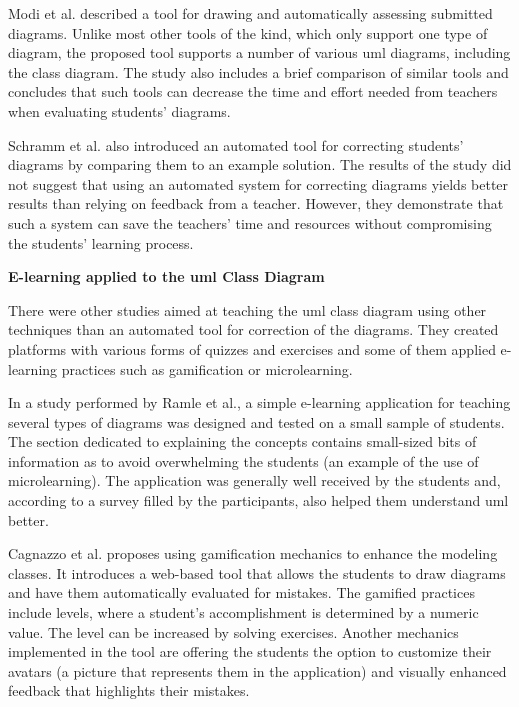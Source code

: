 Modi et al.\cite{uml_eval_auto} described a tool for drawing and automatically assessing submitted diagrams. Unlike most other tools of the kind, which only support one type of diagram, the proposed tool supports a number of various \ac{uml} diagrams, including the class diagram. The study also includes a brief comparison of similar tools and concludes that such tools can decrease the time and effort needed from teachers when evaluating students' diagrams.

Schramm et al.\cite{schramm2012teaching} also introduced an automated tool for correcting students’ diagrams by comparing them to an example solution. The results of the study did not suggest that using an automated system for correcting diagrams yields better results than relying on feedback from a teacher. However, they demonstrate that such a system can save the teachers’ time and resources without compromising the students’ learning process.


\textbf{E-learning applied to the \ac{uml} Class Diagram}

There were other studies aimed at teaching the \acl{uml} class diagram using other techniques than an automated tool for correction of the diagrams. They created platforms with various forms of quizzes and exercises and some of them applied e-learning practices such as gamification or microlearning.

In a study performed by Ramle et al.\cite{ramle2021uml}, a simple e-learning application for teaching several types of diagrams was designed and tested on a small sample of students. The section dedicated to explaining the concepts contains small-sized bits of information as to avoid overwhelming the students (an example of the use of microlearning). The application was generally well received by the students and, according to a survey filled by the participants, also helped them understand \ac{uml} better.

Cagnazzo et al.\cite{cagnazzo2023umlegend} proposes using gamification mechanics to enhance the modeling classes. It introduces a web-based tool that allows the students to draw diagrams and have them automatically evaluated for mistakes. The gamified practices include levels, where a student's accomplishment is determined by a numeric value. The level can be increased by solving exercises. Another mechanics implemented in the tool are offering the students the option to customize their avatars (a picture that represents them in the application) and visually enhanced feedback that highlights their mistakes.

